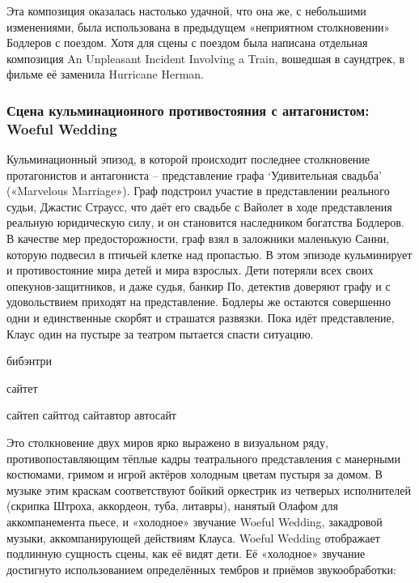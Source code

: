 Эта композиция оказалась настолько удачной, что она же, с небольшими изменениями, была использована в предыдущем «неприятном столкновении» Бодлеров с поездом.
Хотя для сцены с поездом была написана отдельная композиция An Unpleasant Incident Involving a Train, вошедшая в саундтрек, в фильме её заменила Hurricane Herman.

\subsubsection{Сцена кульминационного противостояния с антагонистом: Woeful Wedding}\label{ux441ux446ux435ux43dux430-ux43aux443ux43bux44cux43cux438ux43dux430ux446ux438ux43eux43dux43dux43eux433ux43e-ux43fux440ux43eux442ux438ux432ux43eux441ux442ux43eux44fux43dux438ux44f-ux441-ux430ux43dux442ux430ux433ux43eux43dux438ux441ux442ux43eux43c-woeful-wedding}

Кульминационный эпизод, в которой происходит последнее столкновение протагонистов и антагониста -- представление графа `Удивительная свадьба' («Marvelous Marriage»).
Граф подстроил участие в представлении реального судьи, Джастис Страусс, что даёт его свадьбе с Вайолет в ходе представления реальную юридическую силу, и он становится наследником богатства Бодлеров.
В качестве мер предосторожности, граф взял в заложники маленькую Санни, которую подвесил в птичьей клетке над пропастью.
В этом эпизоде кульминирует и противостояние мира детей и мира взрослых.
Дети потеряли всех своих опекунов-защитников, и даже судья, банкир По, детектив доверяют графу и с удовольствием приходят на представление.
Бодлеры же остаются совершенно одни и единственные скорбят и страшатся развязки.
Пока идёт представление, Клаус один на пустыре за театром пытается спасти ситуацию.

бибэнтри

сайтет\citet{bart.mifologii.1957}

сайтеп\citep{bart.mifologii.1957}
сайтгод\citeyear{bart.smert.1968}
сайтавтор\citeauthor{bart.tretiy.2015}
автосайт\autocite{mfiles.TN.2012}

Это столкновение двух миров ярко выражено в визуальном ряду, противопоставляющим тёплые кадры театрального представления с манерными костюмами, гримом и игрой актёров холодным цветам пустыря за домом.
В музыке этим краскам соответствуют бойкий оркестрик из четверых исполнителей (скрипка Штроха, аккордеон, туба, литавры), нанятый Олафом для аккомпанемента пьесе, и «холодное» звучание Woeful Wedding, закадровой музыки, аккомпанирующей действиям Клауса.
Woeful Wedding отображает подлинную сущность сцены, как её видят дети.
Её «холодное» звучание достигнуто использованием определённых тембров и приёмов звукообработки:





